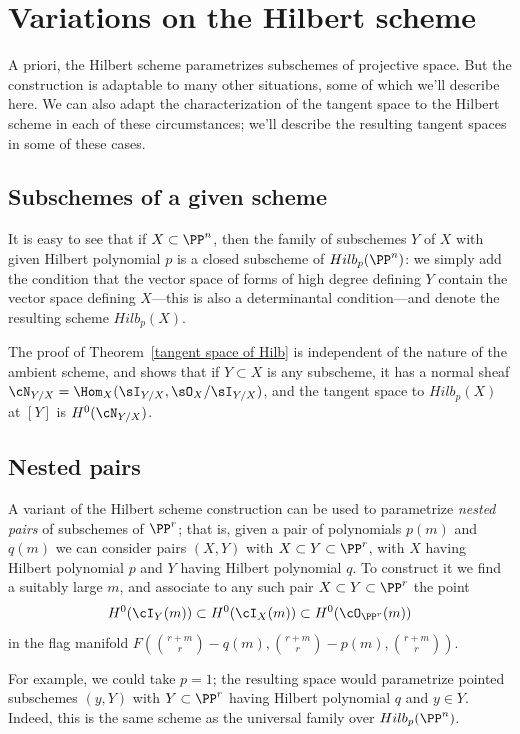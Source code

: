 \section{Variations on the Hilbert scheme}

A priori, the Hilbert scheme parametrizes subschemes of projective space. But the construction is adaptable to many other situations, some of which we'll describe here. We can also adapt the characterization of the tangent space to the Hilbert scheme in each of these circumstances; we'll describe the resulting tangent spaces in some of these cases.


\subsection{Subschemes of a given scheme}

It is easy to see that if $X\subset \PP^n$,
then the family of subschemes $Y$ of $X$ with given Hilbert polynomial $p$ is a closed subscheme of $Hilb_p(\PP^n)$: we simply
add the condition that the vector space of forms of high degree defining $Y$  contain the vector space defining $X$---this is also a determinantal condition---and denote the resulting scheme $Hilb_p(X)$.

The proof of Theorem~\ref{tangent space of Hilb} is independent of the nature of the ambient scheme, and shows that if $Y \subset X$ is any subscheme, it has a normal sheaf $\cN_{Y/X}= \Hom_{X}(\sI_{Y/X}, \sO_{X}/\sI_{Y/X})$, and the tangent space to $Hilb_p(X)$ at $[Y]$ is  $H^0(\cN_{Y/X})$.

\subsection{Nested pairs} A variant of the Hilbert scheme construction can be used to parametrize \emph{nested pairs} of subschemes of $\PP^r$; that is, given a pair of polynomials $p(m)$ and $q(m)$ we can consider pairs $(X,Y)$ with $X \subset Y \subset \PP^r$, with $X$ having Hilbert polynomial $p$ and $Y$ having Hilbert polynomial $q$. To construct it we find a suitably large $m$, and associate to any such pair $X \subset Y \subset \PP^r$ the point
$$
H^0(\cI_Y(m)) \subset H^0(\cI_X(m)) \subset H^0(\cO_{\PP^r}(m))
$$
in the flag manifold $F(\binom{r+m}{r} - q(m), \binom{r+m}{r} - p(m), \binom{r+m}{r})$.

For example, we could take $p=1$; the resulting space would parametrize pointed subschemes $(y,Y)$ with $Y \subset \PP^r$ having Hilbert polynomial $q$ and $y \in Y$. Indeed, this is the same scheme as the universal family over $Hilb_p(\PP^n)$.

